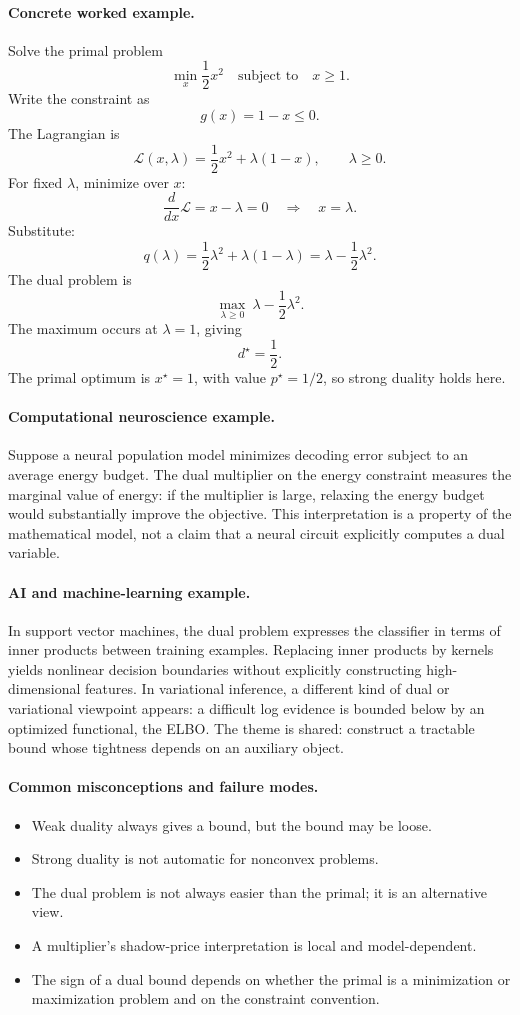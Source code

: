 \paragraph{Concrete worked example.}
Solve the primal problem
\[
\min_x \frac12x^2
\quad\text{subject to}\quad
x\ge 1.
\]
Write the constraint as
\[
g(x)=1-x\le 0.
\]
The Lagrangian is
\[
\mathcal L(x,\lambda)=\frac12x^2+\lambda(1-x),
\qquad \lambda\ge 0.
\]
For fixed \(\lambda\), minimize over \(x\):
\[
\frac{d}{dx}\mathcal L=x-\lambda=0
\quad\Rightarrow\quad
x=\lambda.
\]
Substitute:
\[
q(\lambda)=\frac12\lambda^2+\lambda(1-\lambda)
=\lambda-\frac12\lambda^2.
\]
The dual problem is
\[
\max_{\lambda\ge 0}\ \lambda-\frac12\lambda^2.
\]
The maximum occurs at \(\lambda=1\), giving
\[
d^\star=\frac12.
\]
The primal optimum is \(x^\star=1\), with value \(p^\star=1/2\), so strong duality holds here.

\paragraph{Computational neuroscience example.}
Suppose a neural population model minimizes decoding error subject to an average energy budget. The dual multiplier on the energy constraint measures the marginal value of energy: if the multiplier is large, relaxing the energy budget would substantially improve the objective. This interpretation is a property of the mathematical model, not a claim that a neural circuit explicitly computes a dual variable.

\paragraph{AI and machine-learning example.}
In support vector machines, the dual problem expresses the classifier in terms of inner products between training examples. Replacing inner products by kernels yields nonlinear decision boundaries without explicitly constructing high-dimensional features. In variational inference, a different kind of dual or variational viewpoint appears: a difficult log evidence is bounded below by an optimized functional, the ELBO. The theme is shared: construct a tractable bound whose tightness depends on an auxiliary object.

\paragraph{Common misconceptions and failure modes.}
\begin{itemize}[leftmargin=*]
\item Weak duality always gives a bound, but the bound may be loose.
\item Strong duality is not automatic for nonconvex problems.
\item The dual problem is not always easier than the primal; it is an alternative view.
\item A multiplier's shadow-price interpretation is local and model-dependent.
\item The sign of a dual bound depends on whether the primal is a minimization or maximization problem and on the constraint convention.
\end{itemize}

